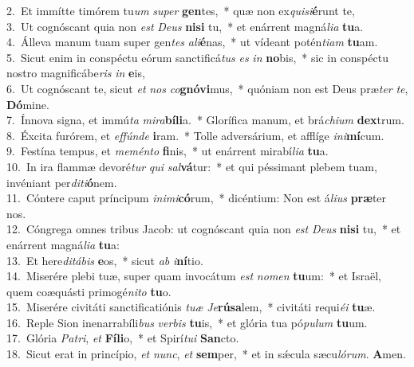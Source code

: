 {2.~}Et immítte timórem tu\textit{um} \textit{su}\textit{per} \textbf{gen}tes,~* quæ non ex\textit{qui}\textit{si}\textbf{é}runt te,\\
{3.~}Ut cognóscant quia non \textit{est} \textit{De}\textit{us} \textbf{ni}\textbf{si} tu,~* et enárrent magná\textit{li}\textit{a} \textbf{tu}a.\\
{4.~}Álleva manum tuam super gen\textit{tes} \textit{a}\textit{li}\textbf{é}nas,~* ut vídeant potén\textit{ti}\textit{am} \textbf{tu}am.\\
{5.~}Sicut enim in conspéctu eórum sanctificá\textit{tus} \textit{es} \textit{in} \textbf{no}bis,~* sic in conspéctu nostro magnificábe\textit{ris} \textit{in} \textbf{e}is,\\
{6.~}Ut cognóscant te, sicut \textit{et} \textit{nos} \textit{co}\textbf{gnó}\textbf{vi}mus,~* quóniam non est Deus præ\textit{ter} \textit{te}, \textbf{Dó}mine.\\
{7.~}Ínnova signa, et immú\textit{ta} \textit{mi}\textit{ra}\textbf{bí}\textbf{li}a.~* Glorífica manum, et brá\textit{chi}\textit{um} \textbf{dex}trum.\\
{8.~}Éxcita furórem, et \textit{ef}\textit{fún}\textit{de} \textbf{i}ram.~* Tolle adversárium, et afflíge \textit{i}\textit{ni}\textbf{mí}cum.\\
{9.~}Festína tempus, et \textit{me}\textit{mén}\textit{to} \textbf{fi}nis,~* ut enárrent mirabí\textit{li}\textit{a} \textbf{tu}a.\\
{10.~}In ira flammæ devoré\textit{tur} \textit{qui} \textit{sal}\textbf{vá}tur:~* et qui péssimant plebem tuam, invéniant per\textit{di}\textit{ti}\textbf{ó}nem.\\
{11.~}Cóntere caput príncipum \textit{i}\textit{ni}\textit{mi}\textbf{có}rum,~* dicéntium: Non est á\textit{li}\textit{us} \textbf{præ}ter nos.\\
{12.~}Cóngrega omnes tribus Jacob: ut cognóscant quia non \textit{est} \textit{De}\textit{us} \textbf{ni}\textbf{si} tu,~* et enárrent magná\textit{li}\textit{a} \textbf{tu}a:\\
{13.~}Et here\textit{di}\textit{tá}\textit{bis} \textbf{e}os,~* sicut \textit{ab} \textit{i}\textbf{ní}tio.\\
{14.~}Miserére plebi tuæ, super quam invocátum \textit{est} \textit{no}\textit{men} \textbf{tu}um:~* et Israël, quem coæquásti primogé\textit{ni}\textit{to} \textbf{tu}o.\\
{15.~}Miserére civitáti sanctificatiónis \textit{tu}\textit{æ} \textit{Je}\textbf{rú}\textbf{sa}lem,~* civitáti requi\textit{é}\textit{i} \textbf{tu}æ.\\
{16.~}Reple Sion inenarrabíli\textit{bus} \textit{ver}\textit{bis} \textbf{tu}is,~* et glória tua pó\textit{pu}\textit{lum} \textbf{tu}um.\\
{17.~}Glória \textit{Pa}\textit{tri}, \textit{et} \textbf{Fí}\textbf{li}o,~* et Spirí\textit{tu}\textit{i} \textbf{San}cto.\\
{18.~}Sicut erat in princípio, \textit{et} \textit{nunc}, \textit{et} \textbf{sem}per,~* et in sǽcula sæcu\textit{ló}\textit{rum}. \textbf{A}men.\\

